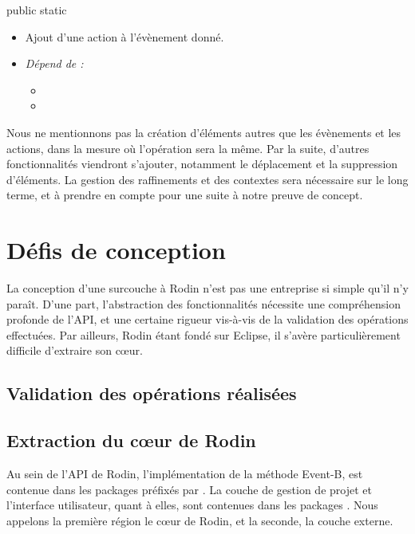 \begin{labeling}{public static}
    \item [\javacode{public static}] 
        \begin{itemize}[label={}]
            \item Ajout d'une action à l'évènement donné.
            \item \textit{Dépend de :}
                \begin{itemize}
                    \item {}
                    \item {}
                \end{itemize}
        \end{itemize}

\end{labeling}

Nous ne mentionnons pas la création d'éléments autres que les évènements et les actions, dans la mesure où l'opération sera la même.
Par la suite, d'autres fonctionnalités viendront s'ajouter, notamment le déplacement et la suppression d'éléments.
La gestion des raffinements et des contextes sera nécessaire sur le long terme, et à prendre en compte pour une suite à notre preuve de concept.


\section{Défis de conception}

La conception d'une surcouche à Rodin n'est pas une entreprise si simple qu'il n'y paraît.
D'une part, l'abstraction des fonctionnalités nécessite une compréhension profonde de l'API, et une certaine rigueur vis-à-vis de la validation %
des opérations effectuées.
Par ailleurs, Rodin étant fondé sur Eclipse, il s'avère particulièrement difficile d'extraire son cœur.


\subsection{Validation des opérations réalisées}


\subsection{Extraction du cœur de Rodin}

Au sein de l'API de Rodin, l'implémentation de la méthode Event-B, est contenue dans les packages préfixés par .
La couche de gestion de projet et l'interface utilisateur, quant à elles, sont contenues dans les packages .
Nous appelons la première région le cœur de Rodin, et la seconde, la couche externe.

